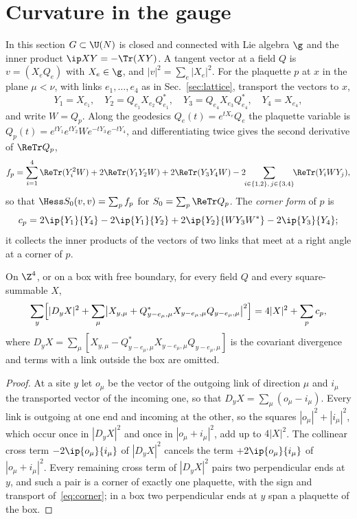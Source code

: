 
\section{Curvature in the gauge}\label{sec:curvature}

In this section $G\subset\U(N)$ is closed and connected with Lie algebra $\g$
and the inner product $\ip XY=-\Tr(XY)$. A tangent vector at a field $Q$ is
$v=(X_eQ_e)$ with $X_e\in\g$, and $|v|^2=\sum_e|X_e|^2$. For the plaquette $p$
at $x$ in the plane $\mu<\nu$, with links $e_1,\dots,e_4$ as in
Sec.~\ref{sec:lattice}, transport the vectors to $x$,
\[
Y_1=X_{e_1},\quad Y_2=Q_{e_1}X_{e_2}Q_{e_1}^*,\quad
Y_3=Q_{e_4}X_{e_3}Q_{e_4}^*,\quad Y_4=X_{e_4},
\]
and write $W=Q_p$. Along the geodesics $Q_e(t)=e^{tX_e}Q_e$ the plaquette
variable is $Q_p(t)=e^{tY_1}e^{tY_2}We^{-tY_3}e^{-tY_4}$, and differentiating
twice gives the second derivative of $\ReTr Q_p$,
\begin{equation}\label{eq:fp}
f_p=\sum_{i=1}^4\ReTr(Y_i^2W)+2\ReTr(Y_1Y_2W)+2\ReTr(Y_3Y_4W)
-2\!\!\sum_{i\in\{1,2\},\,j\in\{3,4\}}\!\!\ReTr(Y_iWY_j),
\end{equation}
so that $\Hess S_0(v,v)=\sum_pf_p$ for $S_0=\sum_p\ReTr Q_p$. The
\emph{corner form} of $p$ is
\begin{equation}\label{eq:corner}
c_p=2\ip{Y_1}{Y_4}-2\ip{Y_1}{Y_2}+2\ip{Y_2}{WY_3W^*}-2\ip{Y_3}{Y_4};
\end{equation}
it collects the inner products of the vectors of two links that meet at a
right angle at a corner of $p$.

\begin{lemma}\label{lem:identity}
On $\Z^4$, or on a box with free boundary, for every field $Q$ and every
square-summable $X$,
\[
\sum_y\Bigl[|D_yX|^2+\sum_\mu\bigl|X_{y,\mu}+Q^*_{y-e_\mu,\mu}X_{y-e_\mu,\mu}
Q_{y-e_\mu,\mu}\bigr|^2\Bigr]=4|X|^2+\sum_pc_p ,
\]
where $D_yX=\sum_\mu[X_{y,\mu}-Q^*_{y-e_\mu,\mu}X_{y-e_\mu,\mu}Q_{y-e_\mu,\mu}]$
is the covariant divergence and terms with a link outside the box are
omitted.
\end{lemma}

\begin{proof}
At a site $y$ let $o_\mu$ be the vector of the outgoing link of direction $\mu$
and $i_\mu$ the transported vector of the incoming one, so that $D_yX=\sum_\mu
(o_\mu-i_\mu)$. Every link is outgoing at one end and incoming at the other, so
the squares $|o_\mu|^2+|i_\mu|^2$, which occur once in $|D_yX|^2$ and once in
$|o_\mu+i_\mu|^2$, add up to $4|X|^2$. The collinear cross term
$-2\ip{o_\mu}{i_\mu}$ of $|D_yX|^2$ cancels the term $+2\ip{o_\mu}{i_\mu}$ of
$|o_\mu+i_\mu|^2$. Every remaining cross term of $|D_yX|^2$ pairs two
perpendicular ends at $y$, and such a pair is a corner of exactly one
plaquette, with the sign and transport of~\eqref{eq:corner}; in a box two
perpendicular ends at $y$ span a plaquette of the box.
\end{proof}

